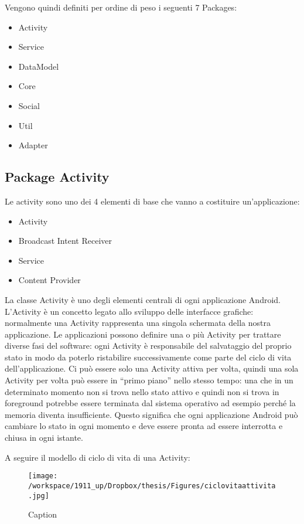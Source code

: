 Vengono quindi definiti per ordine di peso i seguenti 7 Packages:

\begin{itemize}
\item Activity
\item Service
\item DataModel
\item Core
\item Social
\item Util
\item Adapter
\end{itemize}

\subsection{Package Activity}

Le activity sono uno dei 4 elementi di base che vanno a costituire un'applicazione:

\begin{itemize}
\item Activity
\item Broadcast Intent Receiver
\item Service
\item Content Provider
\end{itemize}

La classe Activity è uno degli elementi centrali di ogni applicazione Android. L'Activity è un concetto legato allo sviluppo delle interfacce grafiche: normalmente una Activity rappresenta una singola schermata della nostra applicazione. Le applicazioni possono definire una o più Activity per trattare diverse fasi del software: ogni Activity è responsabile del salvataggio del proprio stato in modo da poterlo ristabilire successivamente come parte del ciclo di vita dell'applicazione.
Ci può essere solo una Activity attiva per volta, quindi una sola Activity per volta può essere in “primo piano” nello stesso tempo: una che in un determinato momento non si trova nello stato attivo e quindi non si trova in foreground potrebbe essere terminata dal sistema operativo ad esempio perché la memoria diventa insufficiente. Questo significa che ogni applicazione Android può cambiare lo stato in ogni momento e deve essere pronta ad essere interrotta e chiusa in ogni istante.

A seguire il modello di ciclo di vita di una Activity:

\begin{figure}[h]\centering  
\texttt{[image: /workspace/1911\_up/Dropbox/thesis/Figures/ciclovitaattivita.jpg]}
\caption[Long caption]{Caption}
\label{pic-a}
\end{figure}

